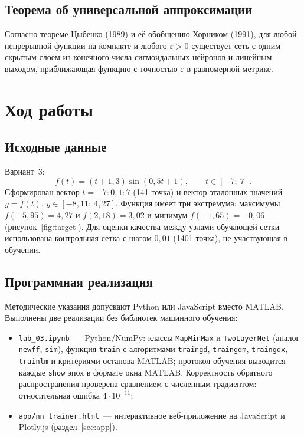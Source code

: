 \documentclass[14pt,a4paper]{extarticle}
\begin{document}
\subsection{Теорема об универсальной аппроксимации}

Согласно теореме Цыбенко (1989) и её обобщению Хорником (1991), для любой непрерывной функции на компакте и любого $\varepsilon > 0$ существует сеть с одним скрытым слоем из конечного числа сигмоидальных нейронов и линейным выходом, приближающая функцию с точностью $\varepsilon$ в равномерной метрике.

\section{Ход работы}

\subsection{Исходные данные}

Вариант~3:
\begin{equation}
f(t) = (t + 1{,}3)\sin(0{,}5t + 1), \qquad t \in [-7;\ 7].
\end{equation}
Сформирован вектор $t = -7 : 0{,}1 : 7$ (141 точка) и вектор эталонных значений $y = f(t)$, $y \in [-8{,}11;\ 4{,}27]$. Функция имеет три экстремума: максимумы $f(-5{,}95) = 4{,}27$ и $f(2{,}18) = 3{,}02$ и минимум $f(-1{,}65) = -0{,}06$ (рисунок~\ref{fig:target}). Для оценки качества между узлами обучающей сетки использована контрольная сетка с шагом $0{,}01$ (1401 точка), не участвующая в обучении.

\subsection{Программная реализация}

Методические указания допускают Python или JavaScript вместо MATLAB. Выполнены две реализации без библиотек машинного обучения:
\begin{itemize}
\item \texttt{lab\_03.ipynb}~--- Python/NumPy: классы \texttt{MapMinMax} и \texttt{TwoLayerNet} (аналог \texttt{newff}, \texttt{sim}), функция \texttt{train} с алгоритмами \texttt{traingd}, \texttt{traingdm}, \texttt{traingdx}, \texttt{trainlm} и критериями останова MATLAB; протокол обучения выводится каждые \texttt{show} эпох в формате окна MATLAB. Корректность обратного распространения проверена сравнением с численным градиентом: относительная ошибка $4 \cdot 10^{-11}$;
\item \texttt{app/nn\_trainer.html}~--- интерактивное веб-приложение на JavaScript и Plotly.js (раздел~\ref{sec:app}).
\end{itemize}
\end{document}
